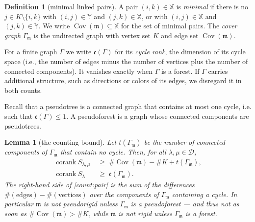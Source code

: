 \documentclass[12pt]{article}
\def\xspace{ }%
\newtheorem{lemma}[lemma]{Lemma}
\theoremstyle{definition}
\newtheorem{definition}[definition]{Definition}
\newcommand{\prig}{pseudorigid\xspace}
\newcommand{\mm}{\mathfrak{m}}
\newcommand{\bmdl}{\mathcal{D}}   %
\newcommand{\XX}{\mathbb{X}}  %
\newcommand{\YY}{\mathbb{Y}}  %
\newcommand{\Kk}{K}         %
\newcommand{\Sop}{S}
\newcommand{\cork}{\operatorname{corank}}
\newcommand{\Cov}{\operatorname{Cov}}  %
\newcommand{\cyc}{\mathfrak{c}}            %
\newcommand{\acyc}{t}                     %
\newcommand{\cgr}{\Gamma}                 %
\begin{document}
\begin{definition}[minimal linked pairs]\label{def:covmm}
A pair $(i,k) \in \XX$ is \emph{minimal} if there is no $j \in \Kk\setminus
\{i,k\}$ with $(i,j) \in \YY$ and $(j,k) \in \XX$, or with $(i,j) \in \XX$
and $(j,k) \in \YY$. We write $\Cov(\mm) \subseteq \XX$ for the set of minimal pairs.
The \emph{cover graph} $\cgr_\mm$ is the undirected graph with vertex set
$\Kk$ and edge set $\Cov(\mm)$.
\end{definition}

For a finite graph $\cgr$ we write $\cyc(\cgr)$ for its \emph{cycle rank}, the dimension
of its cycle space (i.e., the number of edges minus the number of vertices plus the number of connected components).
It vanishes exactly when $\cgr$ is a forest. If $\cgr$
carries additional structure, such as directions or colors of its edges, we
disregard it in both counts.


Recall that a pseudotree is a connected graph that contains at most one cycle, i.e. such that
$\cyc(\cgr)\le1$. A pseudoforest is a graph whose connected components are pseudotrees.

\begin{lemma}[the counting bound]\label{lem:countmm}
Let $\acyc(\cgr_\mm)$ be the number of connected components of $\cgr_\mm$ that
contain no cycle. Then, for all $\lambda,\mu \in \bmdl$,
\begin{subequations}\label{eq:countbound}
\begin{align}
   \cork \Sop_{\lambda,\mu} &\;\ge\;
      \#\Cov(\mm) - \#\Kk + \acyc(\cgr_\mm) , \label{count:pair}\\
   \cork \Sop_\lambda &\;\ge\; \cyc(\cgr_\mm) . \label{count:sing}
\end{align}
\end{subequations}
The right-hand side of \eqref{count:pair} is the sum of the differences
$\#(\text{edges}) - \#(\text{vertices})$ over the components of $\cgr_\mm$
containing a cycle. In particular $\mm$ is not \prig unless $\cgr_\mm$ is
a \emph{pseudoforest} --- and thus not as soon as
$\#\Cov(\mm) > \#\Kk$, while $\mm$ is not rigid unless $\cgr_\mm$ is a forest.
\end{lemma}
\end{document}

